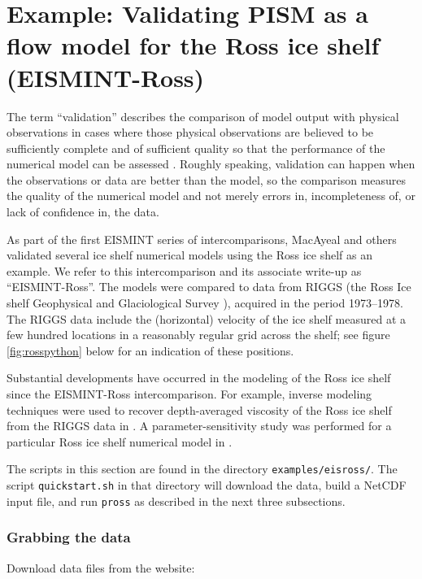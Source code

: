 
\section{Example: Validating PISM as a flow model for the Ross ice shelf (EISMINT-Ross)}\label{sec:ross}    

The term ``validation'' describes the comparison of model output with physical observations in cases where those physical observations are believed to be sufficiently complete and of sufficient quality so that the performance of the numerical model can be assessed \cite{Roache,Wesseling}.  Roughly speaking, validation can happen when the observations or data are better than the model, so the comparison measures the quality of the numerical model and not merely errors in, incompleteness of, or lack of confidence in, the data.

As part of the first EISMINT series of intercomparisons, MacAyeal and others \cite{MacAyealetal} validated several ice shelf numerical models using the Ross ice shelf as an example.  We refer to this intercomparison and its associate write-up \cite{MacAyealetal} as ``EISMINT-Ross''.  The models were compared to data from RIGGS (the Ross Ice shelf Geophysical and Glaciological Survey \cite{RIGGS2,RIGGS1}), acquired in the period 1973--1978.   The RIGGS data include the (horizontal) velocity of the ice shelf measured at a few hundred locations in a reasonably regular grid across the shelf; see figure \ref{fig:rosspython} below for an indication of these positions.

Substantial developments have occurred in the modeling of the Ross ice shelf since the EISMINT-Ross intercomparison.  For example, inverse modeling techniques were used to recover depth-averaged viscosity of the Ross ice shelf from the RIGGS data in \cite{RommelaereMacAyeal}. A parameter-sensitivity study was performed for a particular Ross ice shelf numerical model in \cite{HumbertGreveHutter}.

The scripts in this section are found in the directory \texttt{examples/eisross/}.  The script \texttt{quickstart.sh} in that directory will download the data, build a NetCDF input file, and run \texttt{pross} as described in the next three subsections.

\subsubsection*{Grabbing the data}  Download data files from the website:

